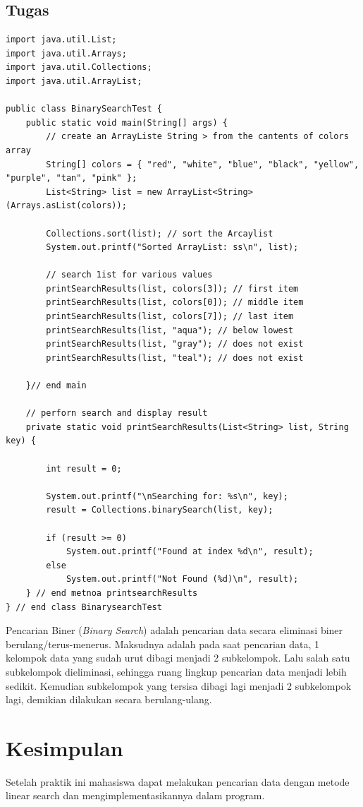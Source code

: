 \documentclass[a4paper,12pt]{article}
\begin{document}
\newpage

\subsection{Tugas}
\begin{lstlisting}
import java.util.List;
import java.util.Arrays;
import java.util.Collections;
import java.util.ArrayList;

public class BinarySearchTest {
    public static void main(String[] args) {
        // create an ArrayListe String > from the cantents of colors array
        String[] colors = { "red", "white", "blue", "black", "yellow", "purple", "tan", "pink" };
        List<String> list = new ArrayList<String>(Arrays.asList(colors));

        Collections.sort(list); // sort the Arcaylist
        System.out.printf("Sorted ArrayList: ss\n", list);

        // search 1ist for various values
        printSearchResults(list, colors[3]); // first item
        printSearchResults(list, colors[0]); // middle item
        printSearchResults(list, colors[7]); // last item
        printSearchResults(list, "aqua"); // below lowest
        printSearchResults(list, "gray"); // does not exist
        printSearchResults(list, "teal"); // does not exist

    }// end main

    // perforn search and display result
    private static void printSearchResults(List<String> list, String key) {

        int result = 0;

        System.out.printf("\nSearching for: %s\n", key);
        result = Collections.binarySearch(list, key);

        if (result >= 0)
            System.out.printf("Found at index %d\n", result);
        else
            System.out.printf("Not Found (%d)\n", result);
    } // end metnoa printsearchResults
} // end class BinarysearchTest
\end{lstlisting}
Pencarian Biner (\textit{Binary Search}) adalah pencarian data secara eliminasi biner berulang/terus-menerus. Maksudnya
adalah pada saat pencarian data, 1 kelompok data yang sudah urut dibagi menjadi 2 subkelompok. Lalu salah satu
subkelompok dieliminasi, sehingga ruang lingkup pencarian data menjadi lebih sedikit. Kemudian subkelompok yang tersisa
dibagi lagi menjadi 2 subkelompok lagi, demikian dilakukan secara berulang-ulang.

\newpage

\section{Kesimpulan}
Setelah praktik ini mahasiswa dapat melakukan pencarian data dengan metode linear search dan
mengimplementasikannya dalam program.
\end{document}
